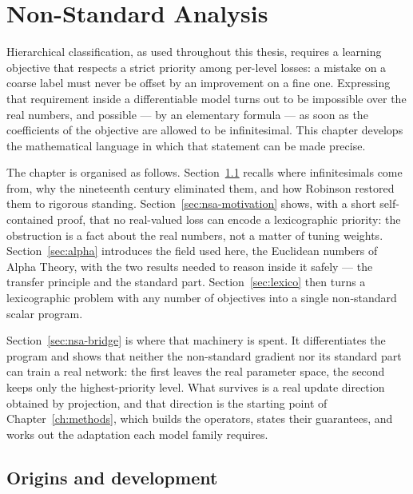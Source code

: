 \chapter{Non-Standard Analysis}
\label{ch:nsa}

Hierarchical classification, as used throughout this thesis, requires a learning
objective that respects a strict priority among per-level losses: a mistake on a
coarse label must never be offset by an improvement on a fine one. Expressing that
requirement inside a differentiable model turns out to be impossible over the real
numbers, and possible --- by an elementary formula --- as soon as the coefficients
of the objective are allowed to be infinitesimal. This chapter develops the
mathematical language in which that statement can be made precise.

The chapter is organised as follows. Section~\ref{sec:nsa-origins} recalls where
infinitesimals come from, why the nineteenth century eliminated them, and how
Robinson restored them to rigorous standing. Section~\ref{sec:nsa-motivation} shows,
with a short self-contained proof, that no real-valued loss can encode a
lexicographic priority: the obstruction is a fact about the real numbers, not a
matter of tuning weights. Section~\ref{sec:alpha} introduces the field used here, the
Euclidean numbers of Alpha Theory, with the two results needed to reason inside it
safely --- the transfer principle and the standard part.
Section~\ref{sec:lexico} then turns a lexicographic problem with any number of
objectives into a single non-standard scalar program.

Section~\ref{sec:nsa-bridge} is where that machinery is spent. It differentiates the
program and shows that neither the non-standard gradient nor its standard part can
train a real network: the first leaves the real parameter space, the second keeps
only the highest-priority level. What survives is a real update direction obtained by
projection, and that direction is the starting point of Chapter~\ref{ch:methods},
which builds the operators, states their guarantees, and works out the adaptation
each model family requires.

\section{Origins and development}
\label{sec:nsa-origins}

